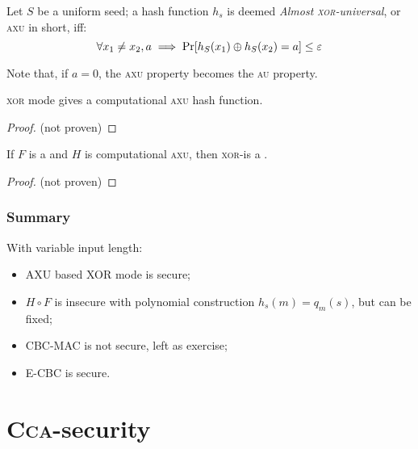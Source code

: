 \begin{definition}
    Let $S$ be a uniform seed; a hash function $h_s$ is deemed \emph{Almost \textsc{xor}-universal}, or \textsc{axu} in short, iff:
    \[
        \forall x_1 \neq x_2, a \implies \Pr[h_S(x_1) \oplus h_S(x_2) = a] \leq \varepsilon \qedhere
    \]
\end{definition}

Note that, if $a = 0$, the \textsc{axu} property becomes the \textsc{au} property.

\begin{lemma}
    \textsc{xor} mode gives a computational \textsc{axu} hash function.
\end{lemma}

\begin{proof}
    (not proven)
\end{proof}

\begin{theorem}
    If $F$ is a \prf{} and $H$ is computational \textsc{axu}, then \textsc{xor}-\mac is a \mac.
\end{theorem}

\begin{proof}
    (not proven)
\end{proof}

\subsubsection{Summary}


With variable input length:
\begin{itemize}
    \item AXU based XOR mode is secure;
    \item $H \circ F$ is insecure with polynomial construction $h_s(m) = q_m(s)$, but can be fixed;
    \item CBC-MAC is not secure, left as exercise;
    \item E-CBC is secure.
\end{itemize}

\pagebreak

\section{\textsc{Cca}-security}

